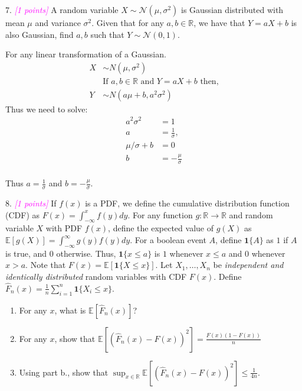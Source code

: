 \documentclass{article}
\newcommand{\field}[1]{\mathbb{#1}}
\newcommand{\1}{\mathbf{1}}
\newcommand{\E}{\mathbb{E}}
\newcommand{\R}{\field{R}} %
\newcommand{\grade}[1]{\small\textcolor{magenta}{\emph{[#1 points]}} \normalsize}
\begin{document}
\newpage



{\color{blue}

7. \grade{1} A random variable $X \sim \mathcal{N}(\mu, \sigma^2)$ is Gaussian distributed with mean $\mu$ and variance $\sigma^2$. Given that for any $a,b \in \R$, we have that $Y = aX + b$ is also Gaussian, find $a,b$ such that $Y \sim \mathcal{N}(0,1)$.\\
}
For any linear transformation of a Gaussian.
\begin{align}
    X & \sim N(\mu, \sigma^2) \\
    & \text{If $a,b \in \R$ and $Y = aX+b$ then,} \\
    Y  & \sim N(a\mu +b, a^2\sigma^2)
\end{align}
Thus we need to solve:
\begin{align}
    a^2\sigma^2 & = 1 \\
    a & = \frac{1}{\sigma}, \\
    \mu/\sigma + b & = 0 \\
    b & = - \frac{\mu}{\sigma}  \\
\end{align}

Thus $ a  = \frac{1}{\sigma}$ and $b  = - \frac{\mu}{\sigma}$. \\






\newpage





{\color{blue}

8. \grade{1} If $f(x)$ is a PDF, we define the cumulative distribution function (CDF) as $F(x) = \int_{-\infty}^x f(y) dy$.
For any function $g : \R \rightarrow \R$ and random variable $X$ with PDF $f(x)$, define the expected value of $g(X)$ as $\E[g(X)] = \int_{-\infty}^\infty g(y) f(y) dy$. For a boolean event $A$, define $\1\{ A \}$ as $1$ if $A$ is true, and $0$ otherwise. Thus, $\1\{ x \leq a \}$ is $1$ whenever $x \leq a$ and $0$ whenever $x > a$. 
Note that $F(x) = \E[\1\{X \leq x\}]$.
Let $X_1,\dots,X_n$ be \emph{independent and identically distributed} random variables with CDF $F(x)$. 
Define $\widehat{F}_n(x) = \frac{1}{n} \sum_{i=1}^n \1\{X_i \leq x\}$.
\begin{enumerate}
	\item For any $x$, what is $\E[ \widehat{F}_n(x) ]$?
	\item For any $x$, show that $\E[ ( \widehat{F}_n(x) - F(x) )^2 ] = \frac{F(x)(1-F(x))}{n}$
	\item Using part b., show that $\displaystyle\sup_{x \in \R} \E[ ( \widehat{F}_n(x) - F(x) )^2 ] \leq \tfrac{1}{4n}$. 
\end{enumerate}
}
\end{document}
